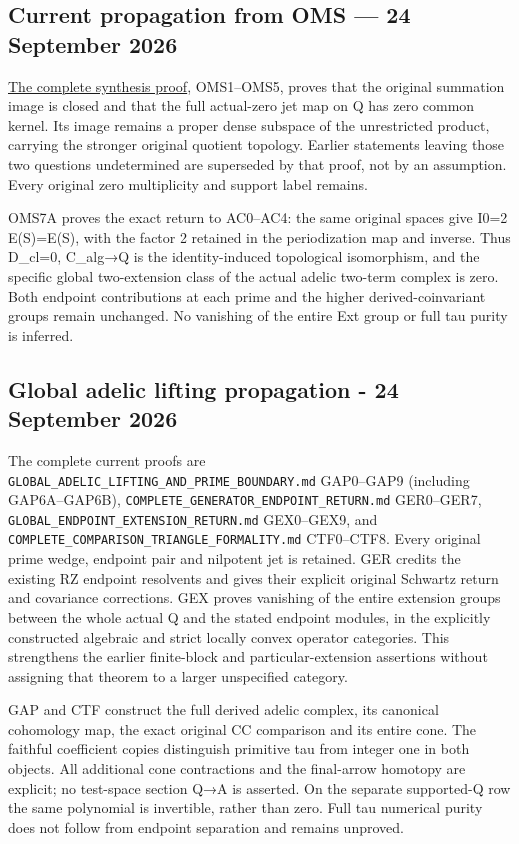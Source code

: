 \subsection{Current propagation from OMS --- 24 September
2026}\label{current-propagation-from-oms-24-september-2026}

\href{ORIGINAL_MELLIN_SPECTRAL_SYNTHESIS.md}{The complete synthesis
proof}, OMS1--OMS5, proves that the original summation image is closed
and that the full actual-zero jet map on Q has zero common kernel. Its
image remains a proper dense subspace of the unrestricted product,
carrying the stronger original quotient topology. Earlier statements
leaving those two questions undetermined are superseded by that proof,
not by an assumption. Every original zero multiplicity and support label
remains.

OMS7A proves the exact return to AC0--AC4: the same original spaces give
I0=2 E(S)=E(S), with the factor 2 retained in the periodization map and
inverse. Thus D\_cl=0, C\_alg→Q is the identity-induced topological
isomorphism, and the specific global two-extension class of the actual
adelic two-term complex is zero. Both endpoint contributions at each
prime and the higher derived-coinvariant groups remain unchanged. No
vanishing of the entire Ext group or full tau purity is inferred.

\subsection{Global adelic lifting propagation - 24 September
2026}\label{global-adelic-lifting-propagation---24-september-2026}

The complete current proofs are
\nolinkurl{GLOBAL_ADELIC_LIFTING_AND_PRIME_BOUNDARY.md} GAP0--GAP9 (including
GAP6A--GAP6B), \nolinkurl{COMPLETE_GENERATOR_ENDPOINT_RETURN.md} GER0--GER7,
\nolinkurl{GLOBAL_ENDPOINT_EXTENSION_RETURN.md} GEX0--GEX9, and
\nolinkurl{COMPLETE_COMPARISON_TRIANGLE_FORMALITY.md} CTF0--CTF8. Every original
prime wedge, endpoint pair and nilpotent jet is retained. GER credits
the existing RZ endpoint resolvents and gives their explicit original
Schwartz return and covariance corrections. GEX proves vanishing of the
entire extension groups between the whole actual Q and the stated
endpoint modules, in the explicitly constructed algebraic and strict
locally convex operator categories. This strengthens the earlier
finite-block and particular-extension assertions without assigning that
theorem to a larger unspecified category.

GAP and CTF construct the full derived adelic complex, its canonical
cohomology map, the exact original CC comparison and its entire cone.
The faithful coefficient copies distinguish primitive tau from integer
one in both objects. All additional cone contractions and the
final-arrow homotopy are explicit; no test-space section Q→A is
asserted. On the separate supported-Q row the same polynomial is
invertible, rather than zero. Full tau numerical purity does not follow
from endpoint separation and remains unproved.
